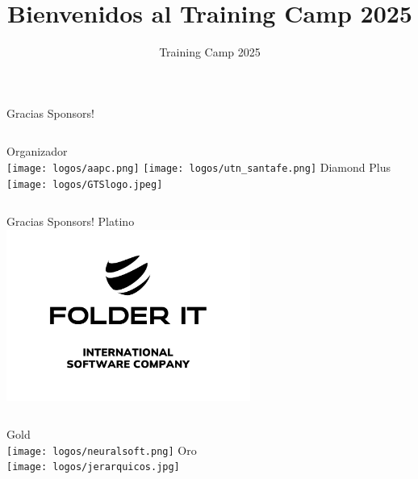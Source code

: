 \documentclass{beamer}
\title %
{Bienvenidos al Training Camp 2025}
\institute[]{Universidad Tecnológica Nacional - Facultad Regional Santa Fe}
\date[TC 2025]{Training Camp 2025}
\begin{document}
\frame{\titlepage}




\begin{frame}{Gracias Sponsors!}
    \begin{columns}[t]
        \centering
        Organizador\\
        \vspace{0.5cm}
        \texttt{[image: logos/aapc.png]}
        \texttt{[image: logos/utn\_santafe.png]}
        \centering
        Diamond Plus\\
        \texttt{[image: logos/GTSlogo.jpeg]}
    \end{columns}
\end{frame}


\begin{frame}{Gracias Sponsors!}
    \centering
    Platino\\
    \includegraphics[width=0.6\textwidth,keepaspectratio]{logos/folder.png}
    
    \vfill
    
    \begin{columns}[b]
        \centering
        Gold\\
        \texttt{[image: logos/neuralsoft.png]}
        \centering
        Oro\\
        \texttt{[image: logos/jerarquicos.jpg]}
    \end{columns}
\end{frame}
\end{document}
